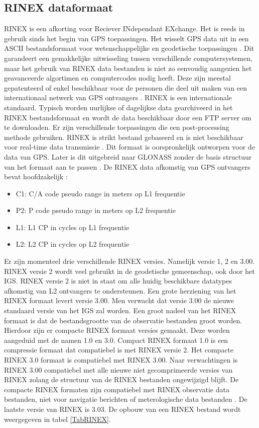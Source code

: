 \subsection{RINEX dataformaat}
\label{LRin}
RINEX is een afkorting voor Reciever INdependant EXchange. Het is reeds in gebruik sinds het begin van GPS toepassingen. Het wisselt GPS data uit in een ASCII bestandsformaat voor wetenschappelijke en geodetische toepassingen \cite{LBibRTCM}. Dit garandeert een gemakkelijke uitwisseling tussen verschillende computersystemen, maar het gebruik van RINEX data bestanden is niet zo eenvoudig aangezien het geavanceerde algortimen en computercodes nodig heeft. Deze zijn meestal gepatenteerd of enkel beschikbaar voor de personen die deel uit maken van een internationaal netwerk van GPS ontvangers \cite{LBibGPS5}. RINEX is een internationale standaard. Typisch worden uurlijkse of dagelijkse data gearchiveerd in het RINEX bestandsformaat en wordt de data beschikbaar door een FTP server om te downloaden. Er zijn verschillende toepassingen die een post-processing methode gebruiken. RINEX is strikt bestand gebaseerd en is niet beschikbaar voor real-time data transmissie \cite{LBibRTCM}. Dit formaat is oorspronkelijk ontworpen voor de data van GPS. Later is dit uitgebreid naar GLONASS zonder de basis structuur van het formaat aan te passen \cite{LBibRINEX}. De RINEX data afkomstig van GPS ontvangers bevat hoofdzakelijk \cite{LBibGPS5}:
\begin{itemize}
	\item C1: C/A code pseudo range in meters op L1 frequentie
	\item P2: P code pseudo range in meters op L2 frequentie
	\item L1: L1 CP in cycles op L1 frequentie
	\item L2: L2 CP in cycles op L2 frequentie
\end{itemize}
 Er zijn momenteel drie verschillende RINEX versies. Namelijk versie 1, 2 en 3.00. RINEX versie  2 wordt veel gebruikt in de geodetische gemeenschap, ook door het IGS. RINEX versie 2 is niet in staat om alle huidig beschikbare datatypes afkomstig van L2 ontvangers te ondersteunen. Een grote herziening van het RINEX formaat levert versie 3.00. Men verwacht dat versie 3.00 de nieuwe standaard versie van het IGS zal worden. Een groot nadeel van het RINEX formaat is dat de bestandsgrootte van de observatie bestanden groot worden. Hierdoor zijn er compacte RINEX formaat versies gemaakt. Deze worden aangeduid met de namen 1.0 en 3.0. Compact RINEX formaat 1.0 is een compressie formaat dat compatiebel is met RINEX versie 2. Het compacte RINEX 3.0 formaat is compatiebel met RINEX 3.00. Naar verwachtingen is RINEX 3.00 compatiebel met alle nieuwe niet gecomprimeerde versies van RINEX zolang de structuur van de RINEX bestanden ongewijzigd blijft.  De compacte RINEX formaten zijn compatiebel met RINEX observatie data bestanden, niet voor navigatie berichten of meterologische data bestanden \cite{LBibRINEX}. De laatste versie van RINEX is 3.03. De opbouw van een RINEX bestand wordt weergegeven in tabel \ref{TabRINEX}.
 
